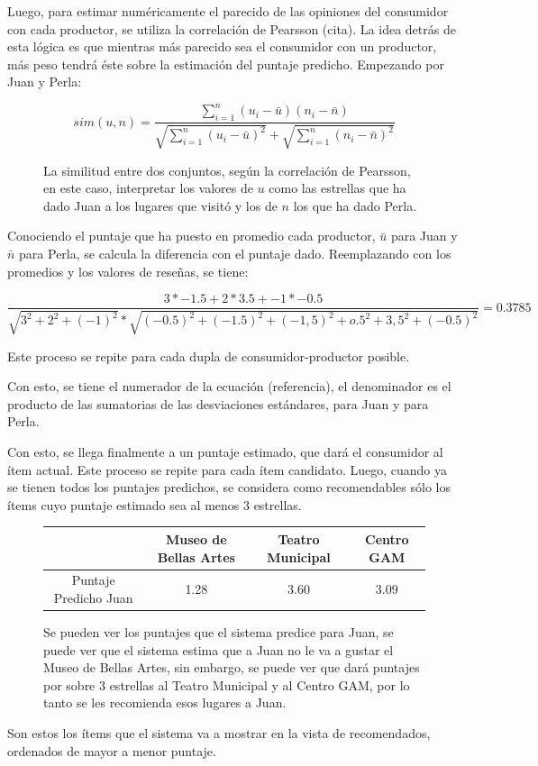 Luego, para estimar numéricamente el parecido de las opiniones del consumidor con cada productor, se utiliza la correlación de Pearsson (cita). La idea detrás de esta lógica es que mientras más parecido sea el consumidor con un productor, más peso tendrá éste sobre la estimación del puntaje predicho. Empezando por Juan y Perla:

\begin{figure}

\begin{equation}
sim(u,n)=\frac{\sum_{i=1}^{n}(u_i-\bar{u})(n_i-\bar{n})}{\sqrt{\sum_{i=1}^{n}(u_i-\bar{u})^2}+\sqrt{\sum_{i=1}^{n}(n_i-\bar{n})^2}}
\end{equation}
\caption{La similitud entre dos conjuntos, según la correlación de Pearsson, en este caso, interpretar los valores de $u$ como las estrellas que ha dado Juan a los lugares que visitó y los de $n$ los que ha dado Perla. }

\end{figure}
Conociendo el puntaje que ha puesto en promedio cada productor, $\bar{u}$ para Juan y $\bar{n}$ para Perla, se calcula la diferencia con el puntaje dado. Reemplazando con los promedios y los valores de reseñas, se tiene:


\begin{equation}
\frac{3*-1.5 + 2*3.5+-1*-0.5}{\sqrt{3^2+2^2+(-1)^2}*\sqrt{(-0.5)^2+(-1.5)^2+(-1,5)^2+o.5^2+3,5^2+(-0.5)^2}}  = 0.3785
\end{equation}


Este proceso se repite para cada dupla de consumidor-productor posible.

Con esto, se tiene el numerador de la ecuación (referencia), el denominador es el producto de las sumatorias de las desviaciones estándares, para Juan y para Perla.

Con esto, se llega finalmente a un puntaje estimado, que dará el consumidor al ítem actual. Este proceso se repite para cada ítem candidato.
Luego, cuando ya se tienen todos los puntajes predichos, se considera como recomendables sólo los ítems cuyo puntaje estimado sea al menos 3 estrellas.


\begin{figure}
\centering
\begin{adjustbox}{max width=\textwidth}
\begin{tabular}{|c|c|c|c|}
\hline
                &   Museo de Bellas Artes & Teatro Municipal & Centro GAM \\

\hline
Puntaje Predicho Juan          & 1.28  &  3.60  & 3.09  \\
\hline


\end{tabular}
\end{adjustbox}
\caption{Se pueden ver los puntajes que el sistema predice para Juan, se puede ver que el sistema estima que a Juan no le va a gustar el Museo de Bellas Artes, sin embargo, se puede ver que dará puntajes por sobre 3 estrellas al Teatro Municipal y al Centro GAM, por lo tanto se les recomienda esos lugares a Juan.}

\end{figure}


Son estos los ítems que el sistema va a mostrar en la vista de recomendados, ordenados de mayor a menor puntaje. 
